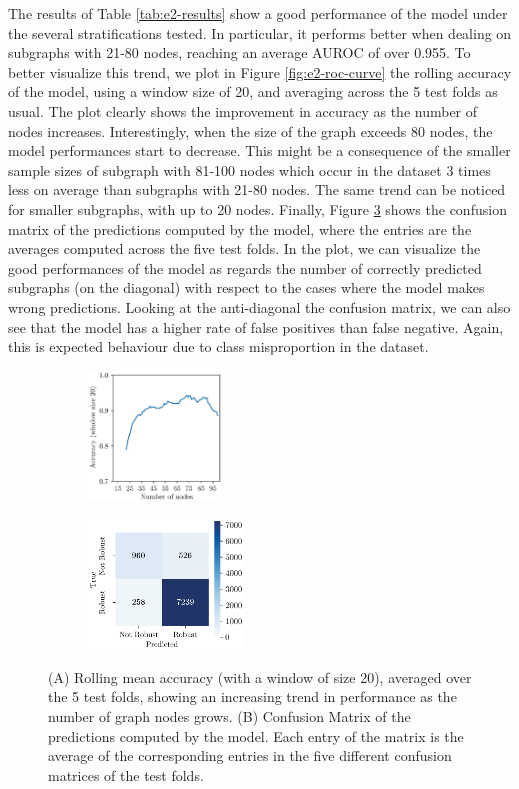 The results of Table \ref{tab:e2-results} show a good performance of the model under the several stratifications tested. In particular, it performs better when dealing on subgraphs with 21-80 nodes, reaching an average AUROC of over 0.955. To better visualize this trend, we plot in Figure \ref{fig:e2-roc-curve} the rolling accuracy of the model, using a window size of 20, and averaging across the 5 test folds as usual. The plot clearly shows the improvement in accuracy as the number of nodes increases. Interestingly, when the size of the graph exceeds 80 nodes, the model performances start to decrease. This might be a consequence of the smaller sample sizes of subgraph with 81-100 nodes which occur in the dataset 3 times less on average than subgraphs with 21-80 nodes. The same trend can be noticed for smaller subgraphs, with up to 20 nodes. Finally, Figure \ref{fig:e2-conf-matrix} shows the confusion matrix of the predictions computed by the model, where the entries are the averages computed across the five test folds. In the plot, we can visualize the good performances of the model as regards the number of correctly predicted subgraphs (on the diagonal) with respect to the cases where the model makes wrong predictions. Looking at the anti-diagonal the confusion matrix, we can also see that the model has a higher rate of false positives than false negative. Again, this is expected behaviour due to class misproportion in the dataset.
\begin{figure}[h!]
    \begin{subfigure}[b]{0.48\linewidth}
    \centering
        \includegraphics[height=130px]{Figures/Chapter5/e2-rolling-acc.eps}
        \subcaption{}\label{fig:e2-rolling-acc}
    \end{subfigure}
    \begin{subfigure}[b]{0.48\linewidth}
        \centering
        \includegraphics[height=130px]{Figures/Chapter5/e2-conf-matrix.eps}
        \subcaption{}\label{fig:e2-conf-matrix}
    \end{subfigure}
    \caption{({\scriptsize A}) Rolling mean accuracy (with a window of size 20), averaged over the 5 test folds, showing an increasing trend in performance as the number of graph nodes grows. ({\scriptsize B}) Confusion Matrix of the predictions computed by the model. Each entry of the matrix is the average of the corresponding entries in the five different confusion matrices of the test folds.}
\end{figure}

